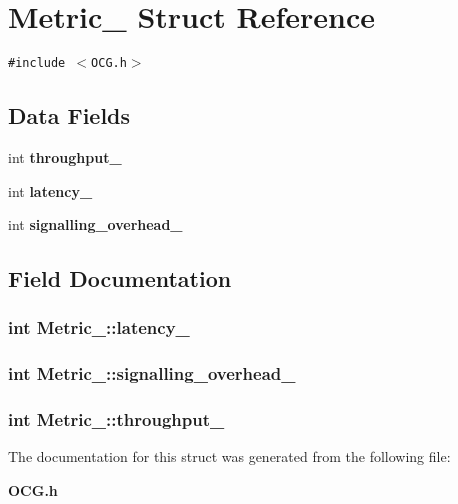 \section{Metric\_\- Struct Reference}
\label{structMetric__}
{\tt \#include $<$OCG.h$>$}

\subsection*{Data Fields}
\begin{CompactItemize}
\item 
int {\bf throughput\_\-}
\item 
int {\bf latency\_\-}
\item 
int {\bf signalling\_\-overhead\_\-}
\end{CompactItemize}


\subsection{Field Documentation}
\subsubsection[{latency\_\-}]{\setlength{\rightskip}{0pt plus 5cm}int {\bf Metric\_\-::latency\_\-}}\label{structMetric___9330449511b5cd6c308e0be7d0741d03}


\subsubsection[{signalling\_\-overhead\_\-}]{\setlength{\rightskip}{0pt plus 5cm}int {\bf Metric\_\-::signalling\_\-overhead\_\-}}\label{structMetric___472fe8aa005779c79efeb0e979edb73f}


\subsubsection[{throughput\_\-}]{\setlength{\rightskip}{0pt plus 5cm}int {\bf Metric\_\-::throughput\_\-}}\label{structMetric___726f6b209d34d08307a5297b8fad7664}




The documentation for this struct was generated from the following file:\begin{CompactItemize}
\item 
{\bf OCG.h}\end{CompactItemize}
